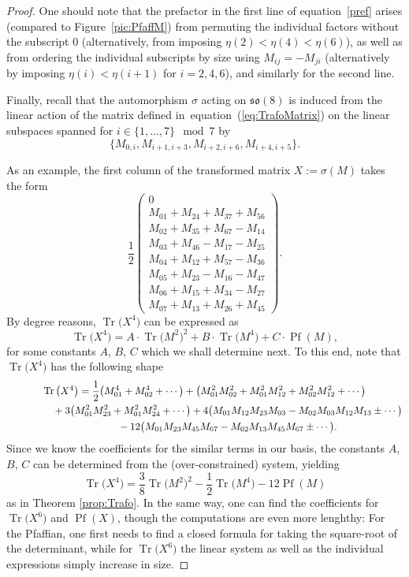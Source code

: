 \documentclass[10pt,a4paper]{amsart}
\numberwithin{equation}{section}
\newcommand{\Pf}{\operatorname{Pf}}
\newcommand{\Tr}{\operatorname{Tr}}
\begin{document}
\begin{proof}
One should note that the prefactor in the first line of equation~\eqref{pref} arises
(compared to Figure~\ref{pic:PfaffM})
 from permuting the individual factors without the subscript $0$ (alternatively, from imposing $\eta(2) < \eta(4) < \eta(6)$), as well as from ordering the individual subscripts by size using $M_{ij} = -M_{ji}$ (alternatively by imposing $\eta(i) < \eta(i+1)$ for $i=2,4,6$), and similarly for the second line.

 Finally, recall that the automorphism $\sigma$ acting on $\mathfrak{so}(8)$ is induced from the linear action of the matrix defined in~equation~(\ref{eq:TrafoMatrix}) on the linear subspaces spanned for $i \in \{1,\dots,7\} \mod 7$ by
\[
\{M_{0,i}, M_{i+1,i+3}, M_{i+2,i+6}, M_{i+4,i+5} \}.
\]

As an example, the first column of the transformed matrix $X:= \sigma(M)$ takes the form
\[\frac{1}{2}\left(
\begin{matrix}
 0 \\
 M_{01} + M_{24} + M_{37} + M_{56} \\
 M_{02} + M_{35} + M_{67} - M_{14} \\
 M_{03} + M_{46} - M_{17} - M_{25} \\
 M_{04} + M_{12} + M_{57} - M_{36} \\
 M_{05} + M_{23} - M_{16} - M_{47} \\
 M_{06} + M_{15} + M_{34} - M_{27} \\
 M_{07} + M_{13} + M_{26} + M_{45}
\end{matrix}
\right).
\]
By degree reasons, $ \Tr \big(X^4\big)$ can be expressed as \begin{equation*}
 \Tr \big(X^4\big) = A \cdot \Tr \big(M^2\big)^2 + B \cdot \Tr \big(M^4\big) + C \cdot \Pf (M),
\end{equation*}
for some constants $A$, $B$, $C$ which we shall determine next. To this end, note that $\Tr \big(X^4\big)$ has the following shape
\begin{gather*}
 \Tr\big(X^4\big)= \frac{1}{2} \big( M_{01}^4 + M_{02}^4 + \cdots \big)
 +\big( M_{01}^2 M_{02}^2 + M_{01}^2 M_{12}^2 + M_{02}^2 M_{12}^2 + \cdots\big) \\
\hphantom{\Tr\big(X^4\big)=}{}
+ 3 \big( M_{01}^2 M_{23}^2 + M_{01}^2 M_{24}^2 + \cdots \big)
 + 4 \big( M_{01} M_{12} M_{23} M_{03} - M_{02} M_{03} M_{12} M_{13} \pm \cdots \big) \\
\hphantom{\Tr\big(X^4\big)=}{} -12 \big( M_{01} M_{23} M_{45} M_{67} - M_{02} M_{13} M_{45} M_{67} \pm \cdots \big).
\end{gather*}
Since we know the coefficients for the similar terms in our basis, the constants $A$, $B$, $C$ can be determined from the (over-constrained) system, yielding
\[
\Tr \big(X^4\big) = \frac{3}{8} \Tr \big(M^2\big)^2 - \frac{1}{2} \Tr \big(M^4\big) - 12 \Pf (M) \] as in Theorem \ref{prop:Trafo}. In the same way, one can find the coefficients for $\Tr \big(X^6\big)$ and $\Pf (X)$, though the computations are even more lenghthy: For the Pfaffian, one first needs to find a closed formula for taking the square-root of the determinant, while for $\Tr \big(X^6\big)$ the linear system as well as the individual expressions simply increase in size.
\end{proof}
\end{document}
